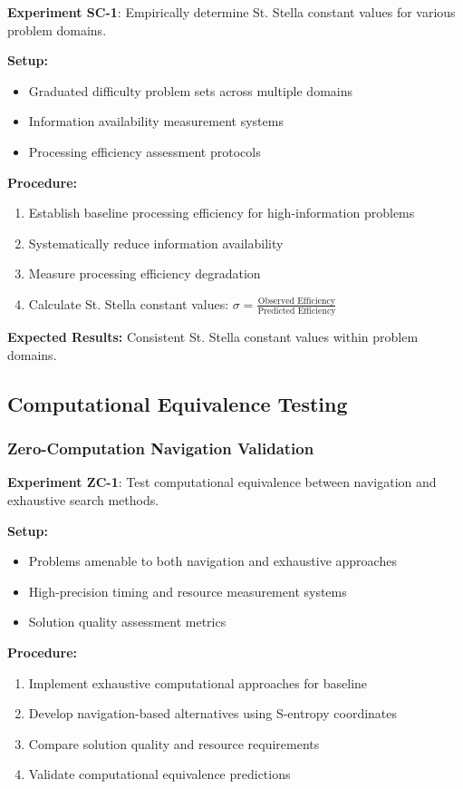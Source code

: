 \documentclass[11pt]{article}
\begin{document}
\textbf{Experiment SC-1}: Empirically determine St. Stella constant values for various problem domains.

\textbf{Setup:}
\begin{itemize}
\item Graduated difficulty problem sets across multiple domains
\item Information availability measurement systems
\item Processing efficiency assessment protocols
\end{itemize}

\textbf{Procedure:}
\begin{enumerate}
\item Establish baseline processing efficiency for high-information problems
\item Systematically reduce information availability
\item Measure processing efficiency degradation
\item Calculate St. Stella constant values: $\sigma = \frac{\text{Observed Efficiency}}{\text{Predicted Efficiency}}$
\end{enumerate}

\textbf{Expected Results:} Consistent St. Stella constant values within problem domains.

\subsection{Computational Equivalence Testing}

\subsubsection{Zero-Computation Navigation Validation}

\textbf{Experiment ZC-1}: Test computational equivalence between navigation and exhaustive search methods.

\textbf{Setup:}
\begin{itemize}
\item Problems amenable to both navigation and exhaustive approaches
\item High-precision timing and resource measurement systems
\item Solution quality assessment metrics
\end{itemize}

\textbf{Procedure:}
\begin{enumerate}
\item Implement exhaustive computational approaches for baseline
\item Develop navigation-based alternatives using S-entropy coordinates
\item Compare solution quality and resource requirements
\item Validate computational equivalence predictions
\end{enumerate}
\end{document}
